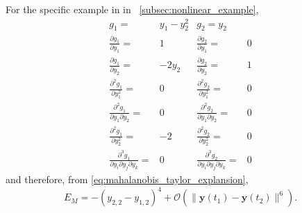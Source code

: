 For the specific example in in \sec~\ref{subsec:nonlinear_example}, 
\begin{equation}
\begin{aligned}
g_1 =& y_1 - y_2^2 
&
g_2 = y_2 
\\
\frac{\partial g_1}{\partial y_1} =& 1
&
\frac{\partial g_2}{\partial y_1} =& 0
\\
\frac{\partial g_1}{\partial y_2} =& -2 y_2
&
\frac{\partial g_2}{\partial y_2} =& 1
\\
\frac{\partial^2 g_1}{\partial y_1^2} =& 0
&
\frac{\partial^2 g_2}{\partial y_1^2} =& 0
\\
\frac{\partial^2 g_1}{\partial y_1 \partial y_2} =& 0
&
\frac{\partial^2 g_2}{\partial y_1 \partial y_2} =& 0
\\
\frac{\partial^2 g_1}{\partial y_2^2} =& -2
&
\frac{\partial^2 g_2}{\partial y_2^2} =& 0
\\
\frac{\partial^3 g_1}{\partial y_i \partial y_j \partial y_k} =& 0
&
\frac{\partial^3 g_2}{\partial y_i \partial y_j \partial y_k} =& 0
\end{aligned}
\end{equation}
%
and therefore, from \eqref{eq:mahalanobis_taylor_explansion},
%
\begin{equation}
E_M =
 -(y_{2,2} - y_{1,2})^4
 + \mathcal{O} (\|\mathbf{y}(t_1) - \mathbf{y}(t_2) \|^6 ) .
\end{equation}


